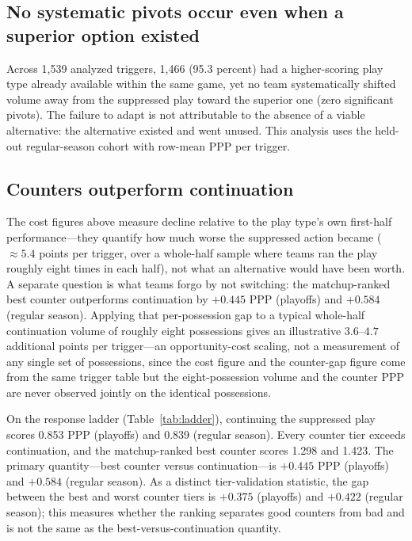 \documentclass[11pt]{article}
\begin{document}
\subsection{No systematic pivots occur even when a superior option existed}

Across 1,539 analyzed triggers, 1,466 (95.3 percent) had a higher-scoring play type already available within the same game, yet no team systematically shifted volume away from the suppressed play toward the superior one (zero significant pivots). The failure to adapt is not attributable to the absence of a viable alternative: the alternative existed and went unused. This analysis uses the held-out regular-season cohort with row-mean PPP per trigger.

\subsection{Counters outperform continuation}
\label{sec:ladder-section}

The cost figures above measure decline relative to the play type's own first-half performance---they quantify how much worse the suppressed action became ($\approx 5.4$ points per trigger, over a whole-half sample where teams ran the play roughly eight times in each half), not what an alternative would have been worth. A separate question is what teams forgo by not switching: the matchup-ranked best counter outperforms continuation by $+0.445$ PPP (playoffs) and $+0.584$ (regular season). Applying that per-possession gap to a typical whole-half continuation volume of roughly eight possessions gives an illustrative $3.6$--$4.7$ additional points per trigger---an opportunity-cost scaling, not a measurement of any single set of possessions, since the cost figure and the counter-gap figure come from the same trigger table but the eight-possession volume and the counter PPP are never observed jointly on the identical possessions.

On the response ladder (Table~\ref{tab:ladder}), continuing the suppressed play scores 0.853 PPP (playoffs) and 0.839 (regular season). Every counter tier exceeds continuation, and the matchup-ranked best counter scores 1.298 and 1.423. The primary quantity---best counter versus continuation---is $+0.445$ PPP (playoffs) and $+0.584$ (regular season). As a distinct tier-validation statistic, the gap between the best and worst counter tiers is $+0.375$ (playoffs) and $+0.422$ (regular season); this measures whether the ranking separates good counters from bad and is not the same as the best-versus-continuation quantity.
\end{document}
